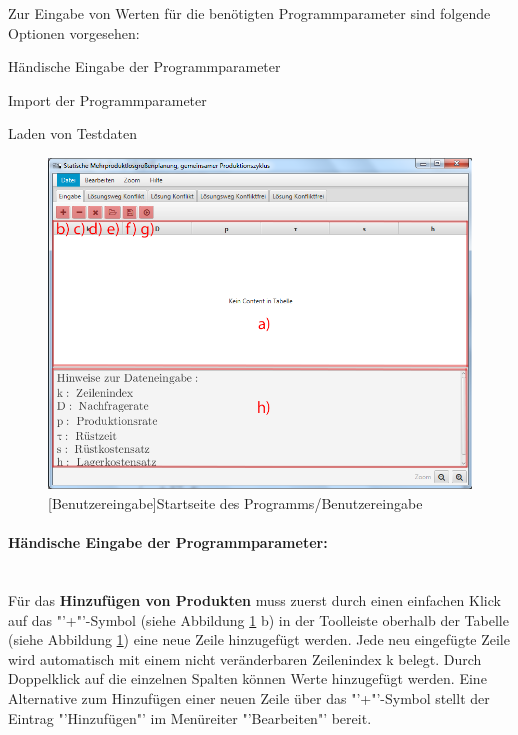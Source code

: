 Zur Eingabe von Werten für die benötigten Programmparameter sind folgende Optionen vorgesehen:
\begin{compactitem}
	\item Händische Eingabe der Programmparameter
	\item Import der Programmparameter
	\item Laden von Testdaten
\end{compactitem}
\begin{figure}[H]
	\centering
	\includegraphics[width=0.8\linewidth]{Bilder/Benutzereingabe1.png} 
	[Benutzereingabe]{Startseite des Programms/Benutzereingabe}
	\label{fig:benutzereingabe}
\end{figure}

\paragraph{Händische Eingabe der Programmparameter:}~\\
Für das \textbf{Hinzufügen von Produkten} muss zuerst durch einen einfachen Klick auf das "'+"'-Symbol (siehe Abbildung \ref{fig:benutzereingabe} b) in der Toolleiste oberhalb der Tabelle (siehe Abbildung \ref{fig:benutzereingabe}) eine neue Zeile hinzugefügt werden. Jede neu eingefügte Zeile wird automatisch mit einem nicht veränderbaren Zeilenindex k belegt. Durch Doppelklick auf die einzelnen Spalten können Werte hinzugefügt werden. Eine Alternative zum Hinzufügen einer neuen Zeile über das "'+"'-Symbol stellt der Eintrag "'Hinzufügen"' im Menüreiter "'Bearbeiten"' bereit.

